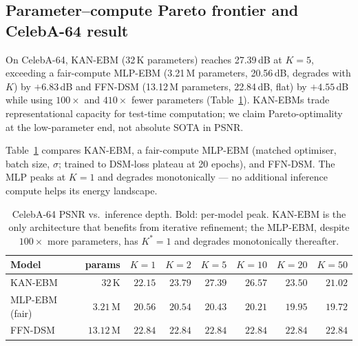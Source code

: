 \documentclass{article}
\begin{document}
\subsection{Parameter--compute Pareto frontier and CelebA-64 result}
\label{sec:pareto}
\label{sec:celeba_fair}

On CelebA-64, KAN-EBM (32\,K parameters) reaches 27.39\,dB at $K{=}5$, exceeding a
fair-compute MLP-EBM (3.21\,M parameters, 20.56\,dB, degrades with $K$) by $+6.83$\,dB
and FFN-DSM (13.12\,M parameters, 22.84\,dB, flat) by $+4.55$\,dB while using
$100\times$ and $410\times$ fewer parameters (Table~\ref{tab:celeba}).
KAN-EBMs trade representational capacity for test-time computation; we claim
Pareto-optimality at the low-parameter end, not absolute SOTA in PSNR.

Table~\ref{tab:celeba} compares KAN-EBM, a fair-compute MLP-EBM (matched optimiser,
batch size, $\sigma$; trained to DSM-loss plateau at 20 epochs), and FFN-DSM.
The MLP peaks at $K{=}1$ and degrades monotonically — no additional inference
compute helps its energy landscape.

\begin{table}[t]
\centering\small
\begin{tabular}{lr|rrrrrr}
\toprule
Model & params & $K{=}1$ & $K{=}2$ & $K{=}5$ & $K{=}10$ & $K{=}20$ & $K{=}50$ \\
\midrule
KAN-EBM           & $32$\,K  & $22.15$ & $23.79$ & $\mathbf{27.39}$ & $26.57$ & $23.50$ & $21.02$ \\
MLP-EBM (fair)    & $3.21$\,M& $\mathbf{20.56}$ & $20.54$ & $20.43$ & $20.21$ & $19.95$ & $19.72$ \\
FFN-DSM           & $13.12$\,M& $22.84$ & $22.84$ & $22.84$ & $22.84$ & $22.84$ & $22.84$ \\
\bottomrule
\end{tabular}
\caption{CelebA-64 PSNR vs.\ inference depth. Bold: per-model peak. KAN-EBM is
the only architecture that benefits from iterative refinement; the MLP-EBM,
despite $100\times$ more parameters, has $K^{*}{=}1$ and degrades monotonically
thereafter.}
\label{tab:celeba}
\end{table}
\end{document}
